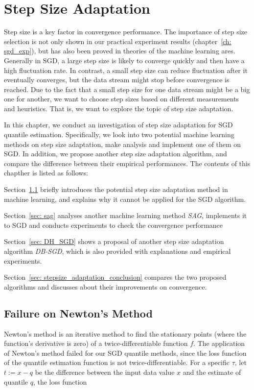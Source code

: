 \chapter{Step Size Adaptation}
\label{ch: stepsize_adaptation}

\graphicspath{{Figures/Stepsize_adapt/}{./}} 

Step size is a key factor in convergence performance. The importance of step size selection is not only shown in our practical experiment results (chapter~\ref{ch: sgd_exp}), but has also been proved in theories of the machine learning ares. Generally in SGD, a large step size is likely to converge quickly and then have a high fluctuation rate. In contrast, a small step size can reduce fluctuation after it eventually converges, but the data stream might stop before convergence is reached.
Due to the fact that a small step size for one data stream might be a big one for another, we want to choose step sizes based on different measurements and heuristics. That is, we want to explore the topic of step size adaptation. 

In this chapter, we conduct an investigation of step size adaptation for SGD quantile estimation. Specifically, we look into two potential machine learning methods on step size adaptation, make analysis and implement one of them on SGD. In addition, we propose another step size adaptation algorithm, and compare the difference between their empirical performances. The contents of this chapther is listed as follows:

Section~\ref{sec: newton} briefly introduces the potential step size adaptation method in machine learning, and explains why it cannot be applied for the SGD algorithm.

Section~\ref{sec: sag} analyses another machine learning method \textit{SAG}, implements it to SGD and conducts experiments to check the convergence performance

Section~\ref{sec: DH_SGD} shows a proposal of another step size adaptation algorithm \textit{DB-SGD}, which is also provided with explanations and empirical experiments.

Section~\ref{sec: stepsize_adaptation_conclusion} compares the two proposed algorithms and discusses about their improvements on convergence.

\section{Failure on Newton's Method}
\label{sec: newton}
Newton's method is an iterative method to find the stationary points (where the function's derivative is zero) of a twice-differentiable function $f$. The application of Newton's method failed for our SGD quantile methods, since the loss function of the quantile estimation function is not twice-differentiable. For a specific $\tau$, let $t := x - q$ be the difference between the input data value $x$ and the estimate of quantile $q$, the loss function 

